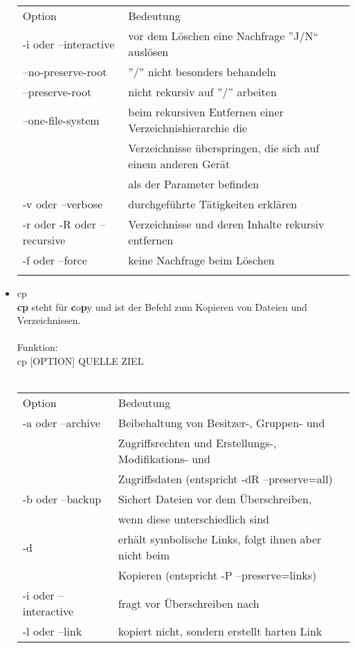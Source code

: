 \begin{itemize}
			\begin{tabular}{ll}
				Option & Bedeutung \\
				-i oder --interactive & vor dem L\"oschen eine Nachfrage ''J/N`` ausl\"osen\\
				--no-preserve-root & ''/'' nicht besonders behandeln\\
				--preserve-root & nicht rekursiv auf ''/'' arbeiten\\
				--one-file-system & beim rekursiven Entfernen einer Verzeichnishierarchie die\\
				 & Verzeichnisse überspringen, die sich auf einem anderen Gerät\\
				 & als der Parameter befinden\\
				-v oder --verbose & durchgef\"uhrte T\"atigkeiten erkl\"aren\\
				-r oder -R oder --recursive & Verzeichnisse und deren Inhalte rekursiv entfernen\\
				-f oder --force & keine Nachfrage beim L\"oschen\\ \\
			\end{tabular}
			\newpage
			\item cp\\
			\textbf{cp} steht für \textbf{c}o\textbf{p}y und ist der Befehl zum Kopieren von Dateien und Verzeichnissen.\\ \\
			Funktion:\\
			cp [OPTION] QUELLE ZIEL\\ \\
			\begin{tabular}{ll}
				Option & Bedeutung \\
				-a oder --archive & Beibehaltung von Besitzer-, Gruppen- und\\
				& Zugriffsrechten und Erstellungs-, Modifikations- und\\
				& Zugriffsdaten (entspricht -dR --preserve=all)\\
				-b oder --backup & Sichert Dateien vor dem \"Uberschreiben,\\
				& wenn diese unterschiedlich sind\\
				-d & erh\"alt symbolische Links, folgt ihnen aber nicht beim\\
				& Kopieren (entspricht -P --preserve=links)\\
				-i oder --interactive & fragt vor \"Uberschreiben nach\\
				-l oder --link & kopiert nicht, sondern erstellt harten Link\\

\end{tabular}
\end{itemize}

